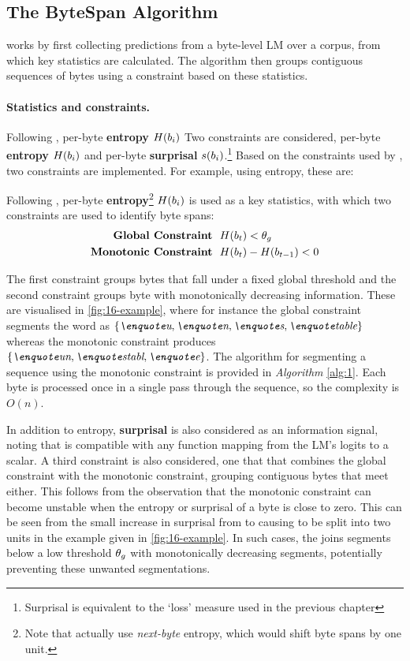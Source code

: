 \subsection{The ByteSpan Algorithm}

\tokname works by first collecting predictions from a byte-level LM over a corpus, from which key statistics are calculated. The algorithm then groups contiguous sequences of bytes using a constraint based on these statistics.

\paragraph{Statistics and constraints.} Following \citet{pagnoni2024byte}, per-byte \textbf{entropy} \(H(b_i)\) Two constraints are considered, per-byte \textbf{entropy} \(H(b_i)\) and per-byte \textbf{surprisal} \(s(b_i)\).\footnote{Surprisal is equivalent to the `loss' measure used in the previous chapter} Based on the constraints used by \citet{pagnoni2024byte}, two constraints are implemented. For example, using entropy, these are:


Following \citet{pagnoni2024byte}, per-byte \textbf{entropy}\footnote{Note that \citet{pagnoni2024byte} actually use \emph{next-byte} entropy, which would shift byte spans by one unit.} \(H(b_i)\) is used as a key statistics, with which two constraints are used to identify byte spans: 
\begin{align}
    \mathrm{\textbf{Global~Constraint}} &~~ H(b_t) < \theta_g \\
    \mathrm{\textbf{Monotonic~Constraint}} &~~ H(b_t) - H(b_{t-1}) < 0 
\end{align}

The first constraint groups bytes that fall under a fixed global threshold and the second constraint groups byte with monotonically decreasing information. These are visualised in \cref{fig:16-example}, where for instance the global constraint segments the word  as $\{\ex{u}, \ex{n}, \ex{s}, \ex{table} \}$ whereas the monotonic constraint produces $\{\ex{un}, \ex{stabl}, \ex{e}\}$. The algorithm for segmenting a sequence using the monotonic constraint is provided in \emph{Algorithm} \ref{alg:1}. Each byte is processed once in a single pass through the sequence, so the complexity is \(O(n)\). 

In addition to entropy, \textbf{surprisal} is also considered as an information signal, noting that \tokname is compatible with any function mapping from the LM's logits to a scalar. A third constraint is also considered, one that that combines the global constraint with the monotonic constraint, grouping contiguous bytes that meet either. This follows from the observation that the monotonic constraint can become unstable when the entropy or surprisal of a byte is close to zero. This can be seen from the small increase in surprisal from  to  causing  to be split into two units in the example given in \cref{fig:16-example}. In such cases, the  joins segments below a low threshold \(\theta_g \) with monotonically decreasing segments, potentially preventing these unwanted segmentations.

